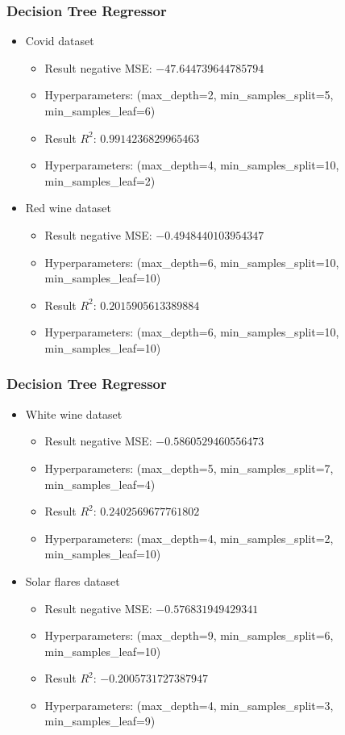 \documentclass{beamer}
\begin{document}
\frame
{
  \frametitle{Decision Tree Regressor}

  \begin{itemize}
    \item Covid dataset
    \begin{itemize}
      \item Result negative MSE: $-47.644739644785794$
      \item Hyperparameters: (max\_depth=2, min\_samples\_split=5, min\_samples\_leaf=6)
      \item Result $R^{2}$: $0.9914236829965463$
      \item Hyperparameters: (max\_depth=4, min\_samples\_split=10, min\_samples\_leaf=2)
    \end{itemize}
    \item Red wine dataset
    \begin{itemize}
      \item Result negative MSE: $-0.4948440103954347$
      \item Hyperparameters: (max\_depth=6, min\_samples\_split=10, min\_samples\_leaf=10)
      \item Result $R^{2}$: $0.2015905613389884$
      \item Hyperparameters: (max\_depth=6, min\_samples\_split=10, min\_samples\_leaf=10)
    \end{itemize}
  \end{itemize}
}

\frame
{
  \frametitle{Decision Tree Regressor}

  \begin{itemize}
    \item White wine dataset
    \begin{itemize}
      \item Result negative MSE: $-0.5860529460556473$
      \item Hyperparameters: (max\_depth=5, min\_samples\_split=7, min\_samples\_leaf=4)
      \item Result $R^{2}$: $0.2402569677761802$
      \item Hyperparameters: (max\_depth=4, min\_samples\_split=2, min\_samples\_leaf=10)
    \end{itemize}
    \item Solar flares dataset
    \begin{itemize}
      \item Result negative MSE: $-0.576831949429341$
      \item Hyperparameters: (max\_depth=9, min\_samples\_split=6, min\_samples\_leaf=10)
      \item Result $R^{2}$: $-0.2005731727387947$
      \item Hyperparameters: (max\_depth=4, min\_samples\_split=3, min\_samples\_leaf=9)
    \end{itemize}
  \end{itemize}
}
\end{document}
